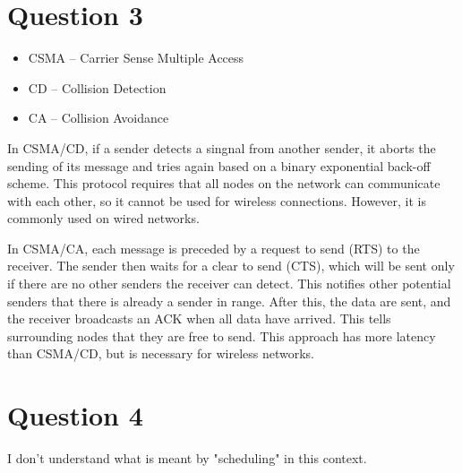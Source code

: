 \documentclass{article}
\begin{document}
\section*{Question 3}
\begin{itemize}
  \item CSMA -- Carrier Sense Multiple Access
  \item CD -- Collision Detection
  \item CA -- Collision Avoidance
\end{itemize}
In CSMA/CD, if a sender detects a singnal from another sender, it aborts the sending of its message and tries again based on a binary exponential back-off scheme. This protocol requires that all nodes on the network can communicate with each other, so it cannot be used for wireless connections. However, it is commonly used on wired networks.

In CSMA/CA, each message is preceded by a request to send (RTS) to the receiver. The sender then waits for a clear to send (CTS), which will be sent only if there are no other senders the receiver can detect. This notifies other potential senders that there is already a sender in range. After this, the data are sent, and the receiver broadcasts an ACK when all data have arrived. This tells surrounding nodes that they are free to send. This approach has more latency than CSMA/CD, but is necessary for wireless networks.

\section*{Question 4}
I don't understand what is meant by "scheduling" in this context.
\end{document}
